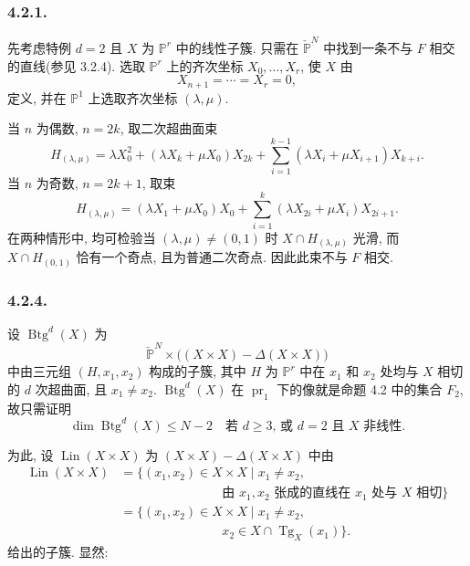 \subsubsection*{4.2.1.}
先考虑特例 $d=2$ 且 $X$ 为 $\mathbb P^r$ 中的线性子簇. 只需在 $\check{\mathbb P}^{N}$ 中找到一条不与 $F$ 相交的直线(参见 3.2.4). 选取 $\mathbb P^r$ 上的齐次坐标 $X_0,\ldots,X_r$, 使 $X$ 由
\[
X_{n+1}=\cdots=X_r=0,
\]
定义, 并在 $\mathbb P^1$ 上选取齐次坐标 $(\lambda,\mu)$.

当 $n$ 为偶数, $n=2k$, 取二次超曲面束
\begin{equation}\tag{4.2.2}
H_{(\lambda,\mu)}
=\lambda X_0^2+(\lambda X_k+\mu X_0)X_{2k}
 +\sum_{i=1}^{k-1}(\lambda X_i+\mu X_{i+1})X_{k+i}.
\end{equation}
当 $n$ 为奇数, $n=2k+1$, 取束
\begin{equation}\tag{4.2.3}
H_{(\lambda,\mu)}
=(\lambda X_1+\mu X_0)X_0
 +\sum_{i=1}^{k}(\lambda X_{2i}+\mu X_i)X_{2i+1}.
\end{equation}
在两种情形中, 均可检验当 $(\lambda,\mu)\ne(0,1)$ 时 $X\cap H_{(\lambda,\mu)}$ 光滑, 而 $X\cap H_{(0,1)}$ 恰有一个奇点, 且为普通二次奇点. 因此此束不与 $F$ 相交.

\subsubsection*{4.2.4.}
设 $\operatorname{Btg}^{d}(X)$ 为
\[
\check{\mathbb P}^{N}\times
\bigl((X\times X)-\Delta(X\times X)\bigr)
\]
中由三元组 $(H,x_1,x_2)$ 构成的子簇, 其中 $H$ 为 $\mathbb P^r$ 中在 $x_1$ 和 $x_2$ 处均与 $X$ 相切的 $d$ 次超曲面, 且 $x_1\ne x_2$. $\operatorname{Btg}^{d}(X)$ 在 $\operatorname{pr}_1$ 下的像就是命题 4.2 中的集合 $F_2$, 故只需证明
\begin{equation}\tag{4.2.5}
\dim\operatorname{Btg}^{d}(X)\leq N-2
\quad\text{若 $d\geq3$, 或 $d=2$ 且 $X$ 非线性.}
\end{equation}

为此, 设 $\operatorname{Lin}(X\times X)$ 为 $(X\times X)-\Delta(X\times X)$ 中由
\begin{equation}\tag{4.2.6}
\begin{aligned}
\operatorname{Lin}(X\times X)
&=\bigl\{(x_1,x_2)\in X\times X\mid x_1\ne x_2,\\[-1ex]
&\hspace{8em}\text{由 $x_1,x_2$ 张成的直线在 $x_1$ 处与 $X$ 相切}
\bigr\}\\
&=\bigl\{(x_1,x_2)\in X\times X\mid x_1\ne x_2,\\[-1ex]
&\hspace{8em}x_2\in X\cap\operatorname{Tg}_X(x_1)\bigr\}.
\end{aligned}
\end{equation}
给出的子簇. 显然:

